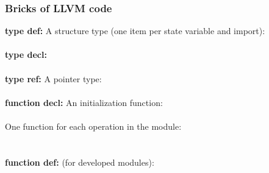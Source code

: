 \documentclass[12pt]{beamer}
\begin{document}
\begin{frame}

  \frametitle{Bricks of LLVM code}
	
{
\newcommand{\myind}{\hspace*{2em}}
\small
\begin{minipage}{.9\textwidth}
\noindent\textbf{type def:}
A structure type (one item per state variable and import): 
\textcolor{blue}{} \\
\\
\noindent\textbf{type decl:}
\textcolor{blue}{} \\
\\
\noindent\textbf{type ref:}
A pointer type: 
\textcolor{blue}{} \\
\\
\noindent\textbf{function decl:} 
An initialization function:\\
\textcolor{blue}{} \\
One function for each operation in the module: \\
\textcolor{blue}{}\\
\\
\noindent\textbf{function def:}
(for developed modules): \\
\textcolor{blue}{} \\
\myind \textcolor{blue}{} \\
\myind \textcolor{blue}{} \\
\textcolor{blue}{\llvm{\}}}
\end{minipage}
}

\end{frame}
\end{document}

